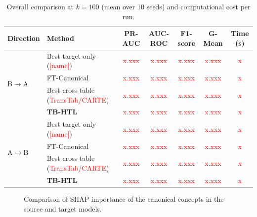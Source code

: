 \documentclass[runningheads]{llncs}
\newcommand{\tbd}[1]{\textcolor{red}{#1}}
\newcommand{\x}{\tbd{x.xxx}}
\newcommand{\figplaceholder}[2]{%
  \fbox{\begin{minipage}[c][#1][c]{0.92\textwidth}\centering
  \textcolor{red}{\small [Figure placeholder]\\ #2}\end{minipage}}}
\begin{document}
\begin{table}[t]
\centering
\caption{Overall comparison at $k=100$ (mean over 10 seeds) and computational cost per run.}\label{tab:overall}
\scriptsize
\setlength{\tabcolsep}{3pt}
\begin{tabular}{@{}llccccc@{}}
\toprule
Direction & Method & PR-AUC & AUC-ROC & F1-score & G-Mean & Time (s) \\
\midrule
\multirow{4}{*}{B$\to$A} & Best target-only (\tbd{[name]}) & \x & \x & \x & \x & \tbd{x} \\
 & FT-Canonical~\cite{levin2023} & \x & \x & \x & \x & \tbd{x} \\
 & Best cross-table (\tbd{TransTab/CARTE}) & \x & \x & \x & \x & \tbd{x} \\
 & \textbf{TB-HTL} & \x & \x & \x & \x & \tbd{x} \\
\midrule
\multirow{4}{*}{A$\to$B} & Best target-only (\tbd{[name]}) & \x & \x & \x & \x & \tbd{x} \\
 & FT-Canonical~\cite{levin2023} & \x & \x & \x & \x & \tbd{x} \\
 & Best cross-table (\tbd{TransTab/CARTE}) & \x & \x & \x & \x & \tbd{x} \\
 & \textbf{TB-HTL} & \x & \x & \x & \x & \tbd{x} \\
\bottomrule
\end{tabular}
\end{table}

\begin{figure}[t]
\centering
\figplaceholder{2.8cm}{Mean absolute SHAP values of the four canonical concepts in the source model (Job Change) and the target model (IBM), side by side, with an example of an individual risk explanation.}
\caption{Comparison of SHAP importance of the canonical concepts in the source and target models.}\label{fig:shap}
\end{figure}

\end{document}

